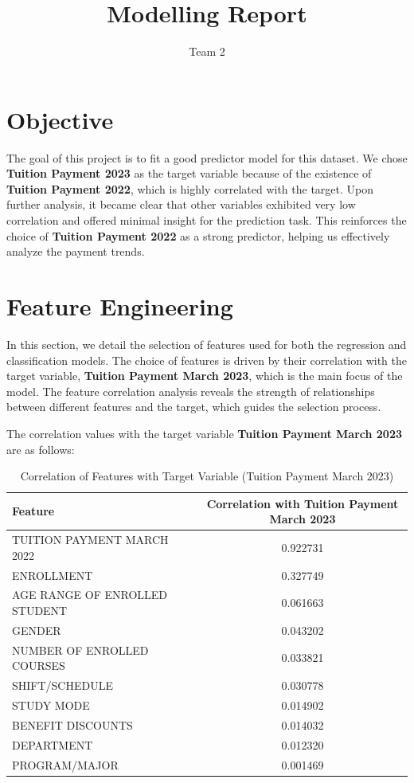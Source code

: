 \documentclass{article}
\title{Modelling Report}
\author{Team 2}
\date{}
\begin{document}
\maketitle

\section{Objective}
The goal of this project is to fit a good predictor model for this dataset. We chose \textbf{Tuition Payment 2023} as the target variable because of the existence of \textbf{Tuition Payment 2022}, which is highly correlated with the target. Upon further analysis, it became clear that other variables exhibited very low correlation and offered minimal insight for the prediction task. This reinforces the choice of \textbf{Tuition Payment 2022} as a strong predictor, helping us effectively analyze the payment trends.


\section{Feature Engineering}

In this section, we detail the selection of features used for both the regression and classification models. The choice of features is driven by their correlation with the target variable, \textbf{Tuition Payment March 2023}, which is the main focus of the model. The feature correlation analysis reveals the strength of relationships between different features and the target, which guides the selection process.

The correlation values with the target variable \textbf{Tuition Payment March 2023} are as follows:

\begin{table}[H]
\centering
\begin{tabular}{|l|c|}
\hline
\textbf{Feature} & \textbf{Correlation with Tuition Payment March 2023} \\
\hline
TUITION PAYMENT MARCH 2022 & 0.922731 \\
ENROLLMENT & 0.327749 \\
AGE RANGE OF ENROLLED STUDENT & 0.061663 \\
GENDER & 0.043202 \\
NUMBER OF ENROLLED COURSES & 0.033821 \\
SHIFT/SCHEDULE & 0.030778 \\
STUDY MODE & 0.014902 \\
BENEFIT DISCOUNTS & 0.014032 \\
DEPARTMENT & 0.012320 \\
PROGRAM/MAJOR & 0.001469 \\
\hline
\end{tabular}
\caption{Correlation of Features with Target Variable (Tuition Payment March 2023)}
\end{table}
\end{document}
